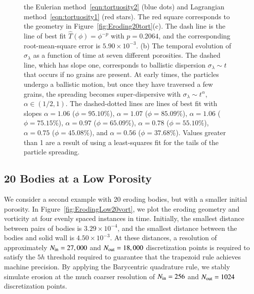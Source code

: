 \documentclass[preprint,10pt]{elsarticle}
\begin{document}
\begin{figure}[H]
{the Eulerian method~\eqref{eqn:tortuosity2} (blue dots) and Lagrangian
method~\eqref{eqn:tortuosity1} (red stars).  The red square corresponds
to the geometry in Figure~\ref{fig:Eroding20tort}(c).  The dash line is
the line of best fit $\widehat{T}(\phi)=\phi^{-p}$ with $p=0.2064$, and
the corresponding root-mean-square error is $5.90 \times 10^{-3}$. (b)
The temporal evolution of $\sigma_\lambda$ as a function of time at
seven different porosities.  The dashed line, which has slope one,
corresponds to ballistic dispersion $\sigma_\lambda \sim t$ that occurs
if no grains are present. At early times, the particles undergo a
ballistic motion, but once they have traversed a few grains, the
spreading becomes super-dispersive with $\sigma_\lambda \sim t^\alpha$,
$\alpha \in (1/2,1)$.  The dashed-dotted lines are lines of best fit
with slopes $\alpha = 1.06$ ($\phi=95.10\%$), $\alpha = 1.07$
($\phi=85.09\%$), $\alpha = 1.06$ ($\phi=75.15\%$), $\alpha = 0.97$
($\phi=65.09\%$), $\alpha = 0.78$ ($\phi=55.10\%$), $\alpha = 0.75$
($\phi=45.08\%$), and $\alpha = 0.56$ ($\phi=37.68\%$).  Values greater
than 1 are a result of using a least-squares fit for the tails of the
particle spreading.}
\end{figure}


\subsection{20 Bodies at a Low Porosity}
We consider a second example with 20 eroding bodies, but with a smaller
initial porosity.  In Figure~\ref{fig:ErodingLow20vort}, we plot the
eroding geometry and vorticity at four evenly spaced instances in time.
Initially, the smallest distance between pairs of bodies is $3.29 \times
10^{-4}$, and the smallest distance between the bodies and solid wall is
$4.50 \times 10^{-3}$.  At these distances, a resolution of
approximately $N_{\mathrm{in}} = 27,000$ and $N_{\mathrm{out}} = 18,000$ discretization
points is required to satisfy the $5h$ threshold required to guarantee
that the trapezoid rule achieves machine precision.  By applying the
Barycentric quadrature rule, we stably simulate erosion at the much
coarser resolution of $N_{\mathrm{in}} = 256$ and $N_{\mathrm{out}} = 1024$ discretization
points.
\end{document}
